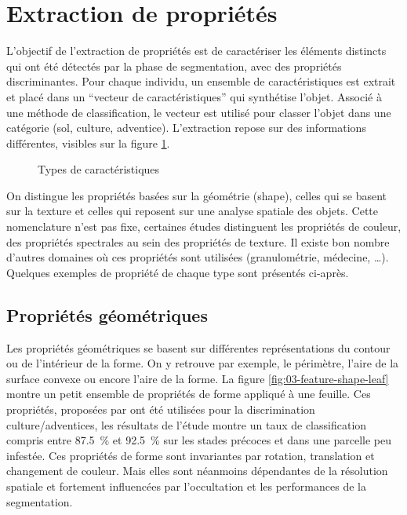 \documentclass[../thesis.tex]{subfiles}
\begin{document}
    
    \newpage
    \section{Extraction de propriétés}
    \label{sec:03-feature-extraction}
    
    L'objectif de l'extraction de propriétés est de caractériser les éléments distincts qui ont été détectés par la phase de segmentation, avec des propriétés discriminantes. Pour chaque individu, un ensemble de caractéristiques est extrait et placé dans un ``vecteur de caractéristiques'' qui synthétise l'objet. Associé à une méthode de classification, le vecteur est utilisé pour classer l'objet dans une catégorie (sol, culture, adventice). L'extraction repose sur des informations différentes, visibles sur la figure \ref{fig:03-feature-extraction-flavor}.
    
    \begin{figure}[H]
        \centering
        
        \caption{Types de caractéristiques}
        \label{fig:03-feature-extraction-flavor}
    \end{figure}
    
    On distingue les propriétés basées sur la géométrie (shape), celles qui se basent sur la texture et celles qui reposent sur une analyse spatiale des objets. Cette nomenclature n'est pas fixe, certaines études distinguent les propriétés de couleur, des propriétés spectrales au sein des propriétés de texture. Il existe bon nombre d'autres domaines où ces propriétés sont utilisées (granulométrie, médecine, \dots). Quelques exemples de propriété de chaque type sont présentés ci-après.
    
    \subsection{Propriétés géométriques} Les propriétés géométriques se basent sur différentes représentations du contour ou de l'intérieur de la forme. On y retrouve par exemple, le périmètre, l'aire de la surface convexe ou encore l'aire de la forme. La figure \ref{fig:03-feature-shape-leaf} montre un petit ensemble de propriétés de forme appliqué à une feuille. Ces propriétés, proposées par \cite{Gao2013ResearchOW} ont été utilisées pour la discrimination culture/adventices, les résultats de l'étude montre un taux de classification compris entre \SI{87.5}{\percent} et \SI{92.5}{\percent} sur les stades précoces et dans une parcelle peu infestée. Ces propriétés de forme sont invariantes par rotation, translation et changement de couleur. Mais elles sont néanmoins dépendantes de la résolution spatiale et fortement influencées par l'occultation et les performances de la segmentation.
    
\end{document}
